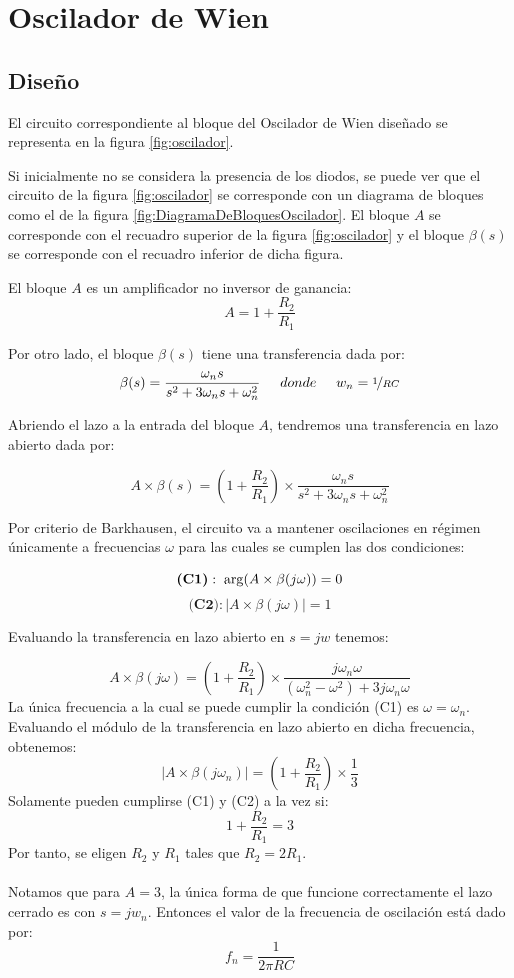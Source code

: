 \section{Oscilador de Wien}
 \subsection{Diseño}
  El circuito correspondiente al bloque del Oscilador de Wien diseñado se representa en la figura \ref{fig:oscilador}.
  
 

Si inicialmente no se considera la presencia de los diodos, se puede ver que el circuito de la figura \ref{fig:oscilador} se corresponde con un diagrama de bloques como el de la figura \ref{fig:DiagramaDeBloquesOscilador}. El bloque $A$ se corresponde con el recuadro superior de la figura \ref{fig:oscilador} y el bloque $\beta(s)$ se corresponde con el recuadro inferior de dicha figura.



El bloque $A$ es un amplificador no inversor de ganancia:
 $$A=1+\frac{R_2}{R_1}$$

 Por otro lado, el bloque $\beta(s)$ tiene una transferencia dada por:
\begin{equation*}
\beta(s)=\frac{\omega_n s}{s^2+3\omega_ns+\omega_n ^2} \hspace{0.5cm}donde\hspace{0.5cm} w_n=\nicefrac{1}{RC}
\end{equation*}

Abriendo el lazo a la entrada del bloque $A$, tendremos una transferencia en lazo abierto dada por:

$$A\times \beta(s) = \left( 1+\frac{R_2}{R_1}\right) \times \frac{\omega_n s}{s^2+3\omega_ns+\omega_n ^2} $$

Por criterio de Barkhausen, el circuito va a mantener oscilaciones en régimen únicamente a frecuencias $\omega$ para las cuales se cumplen las dos condiciones:

$$\textbf{(C1)}: \hspace{0.1cm}\arg\left(A\times \beta(j\omega)\right)=0$$
$$\textbf{(C2)}: \left| A\times \beta(j\omega)\right| =1$$

Evaluando la transferencia en lazo abierto en $s=jw$ tenemos:

$$A\times \beta(j\omega) = \left( 1+\frac{R_2}{R_1}\right) \times \frac{j\omega_n\omega}{(\omega_n ^2-\omega ^2) +3j\omega_n\omega} $$
La única frecuencia a la cual se puede cumplir la condición (C1) es $\omega= \omega_n$. Evaluando el módulo de la transferencia en lazo abierto en dicha frecuencia, obtenemos:
$$\left| A\times \beta(j\omega_n)\right|  = \left( 1+\frac{R_2}{R_1}\right)\times\frac{1}{3}$$
Solamente pueden cumplirse (C1) y (C2) a la vez si:
$$1+\frac{R_2}{R_1}=3$$
Por tanto, se eligen $R_2$ y $R_1$ tales que $R_2=2R_1$.\\\\
Notamos que para $A=3$, la única forma de que funcione correctamente el lazo cerrado es con $s=jw_n$. Entonces el valor de la frecuencia de oscilación está dado por: 
$$f_n=\frac{1}{2\pi RC}$$

